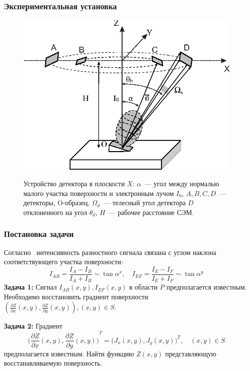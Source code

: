 \documentclass{beamer}
\begin{document}
\begin{frame}
    \frametitle{Экспериментальная установка}
    \begin{figure}
        \includegraphics[width=0.6\linewidth]{detector_structure.eps}
        \caption{Устройство детектора в плоскости $X$: $\alpha$~--- угол между нормалью малого
участка поверхности и электронным лучом $I_0$, $A,B,C,D$~--- детекторы, O-образец,
$\Omega_{d}$~--- телесный угол детектора $D$ отклоненного на угол $\theta_d$, $H$~--- рабочее
расстояние СЭМ.}
        {\label{fig:detector_structure}}%
    \end{figure}
\end{frame}

\begin{frame}
    \frametitle{Постановка задачи}
    Согласно~\cite{PaluszynskiSlowko2005Vacuum, DrzazgaPaluszynski2005Measurement} интенсивность
    разностного сигнала связана с углом наклона соответствующего участка поверхности:
    \begin{equation*}
        I_{AB} = \frac{I_A - I_B}{I_A + I_B} \sim \tan{\alpha^x}, \quad
        I_{EF} = \frac{I_E - I_F}{I_E + I_F} \sim \tan{\alpha^y}
    \end{equation*}
    \textbf{Задача 1:} Сигнал $I_{AB}(x,y), I_{EF}(x,y)$ в области $P$ предполагается известным.
    Необходимо восстановить градиент поверхности
    $
        \left(\frac{\partial Z}{\partial x}(x,y), \frac{\partial Z}{\partial y} (x,y) \right),
        (x,y) \in S
    $.

    \vfill

    \textbf{Задача 2:} Градиент
    \begin{equation}
        {\Big(\frac{\partial Z}{\partial x}(x,y),
        \frac{\partial Z}{\partial y} (x,y)\Big)}^{T} =
        {\big(J_x(x,y), J_y(x,y)\big)}^T, \quad (x,y) \in S
        \label{eq:problem_statement}
    \end{equation}
    предполагается известным. Найти функцию $Z(x,y)$ представляющую восстанавливаемую поверхность.
\end{frame}
\end{document}
